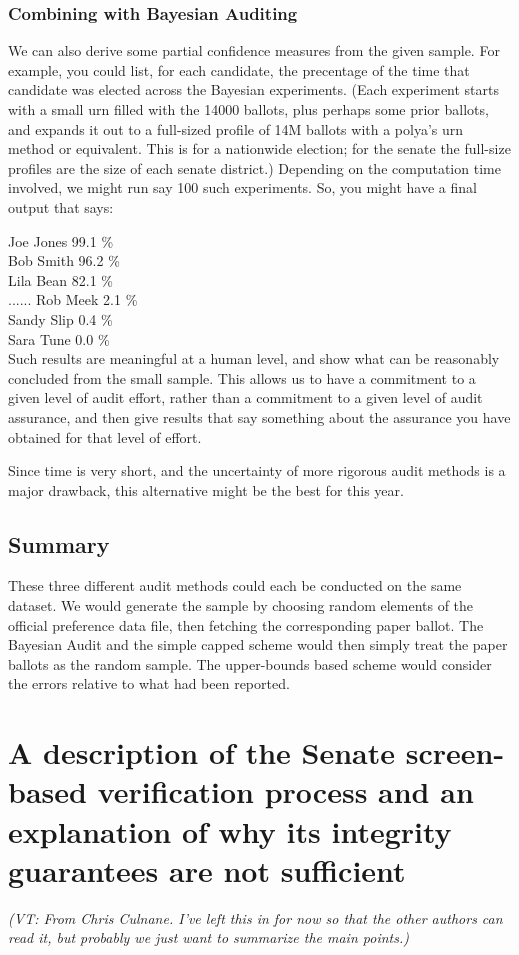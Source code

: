 \documentclass[10pt,a4paper]{article}
\newcommand{\VTNote}[1]{{\it(VT: #1)}}
\begin{document}
\subsubsection{Combining with Bayesian Auditing}
We can also derive some partial confidence measures from the
given sample.  For example, you could list, for each candidate,
the precentage of the time that candidate was elected across the Bayesian
experiments.  (Each experiment starts with a small urn filled with
the 14000 ballots, plus perhaps some prior ballots, and expands
it out to a full-sized profile of 14M ballots with a polya's urn
method or equivalent.  This is for a nationwide election; for the
senate the full-size profiles are the size of each senate district.)
Depending on the computation time involved, we might run say
100 such experiments.  So, you might have a final output that says:

Joe Jones     99.1 \% \\
Bob Smith     96.2 \% \\
Lila Bean       82.1 \% \\
......
Rob Meek        2.1 \% \\ 
Sandy Slip       0.4 \%   \\
Sara Tune        0.0 \%   \\

Such results are meaningful at a human level, and show
what can be reasonably concluded from the small sample.
This allows us to have a commitment to a given
level of audit effort, rather than a commitment to a given level
of audit assurance, and then give results that say something about
the assurance you have obtained for that level of effort.

Since time is very short, and the uncertainty of more rigorous audit methods is a major drawback, this alternative might be the best for this year.

\subsection{Summary}
These three different audit methods could each be conducted on the same dataset.  We would generate the sample by choosing random elements of the official preference data file, then fetching the corresponding paper ballot.  The Bayesian Audit and the simple capped scheme would then simply treat the paper ballots as the random sample.  The upper-bounds based scheme would consider the errors relative to what had been reported.

\section{A description of the Senate screen-based verification process and an explanation of why its integrity guarantees are not sufficient}
\VTNote{From Chris Culnane.  I've left this in for now so that the other authors can read it, but probably we just want to summarize the main points.}
\end{document}
